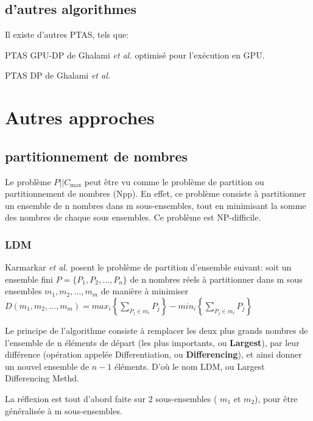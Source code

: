 \documentclass[a4paper,12pt]{report}
\theoremstyle{plain}				%
\theoremstyle{definition}				%
\newcommand\problemGrahamP{$P||C_{\max}$\xspace}
\begin{document}
\subsection{d'autres algorithmes}
Il existe d'autres PTAS, tels que:

PTAS GPU-DP de Ghalami \emph{et al.}
\cite{li2018gpu} optimisé pour l'exécution en GPU.

PTAS DP de Ghalami \emph{et al.} \cite{ghalami2019scheduling}


\section{Autres approches}

\subsection{partitionnement de nombres}

Le problème \problemGrahamP peut être vu comme le problème de
partition ou partitionnement de nombres (Npp).
En effet, ce problème consiste à partitionner un ensemble de n nombres
dans m sous-ensembles, tout en minimisant la somme des nombres de
chaque sous ensembles.
Ce problème est NP-difficile.

\subsubsection{LDM}


Karmarkar \emph{et al.}
\cite{karmarkar1982differencing} posent le problème de partition
d'ensemble suivant: soit un ensemble fini
$P=\{P_1, P_2, \ldots, P_n\}$ de n nombres réels à partitionner dans m
sous ensembles $m_1, m_2, \ldots, m_m$ de manière à minimiser
$D(m_1, m_2, \ldots, m_m) = max_i \left\{ \sum_{P_j \in m_i}P_j
\right\} - min_i \left\{ \sum_{P_j \in m_i}P_j \right\}$

Le principe de l'algorithme consiste à remplacer les deux plus grands
nombres de l'ensemble de n éléments de départ (les plus importants, ou
\textbf{Largest}), par leur différence (opération appelée
Differentiation, ou \textbf{Differencing}), et ainsi donner un nouvel
ensemble de $n-1$ éléments.
D'où le nom LDM, ou Largest Differencing Methd.


La réflexion est tout d'abord faite sur 2 sous-ensembles ( $m_1$ et
$m_2$), pour être généralisée à m sous-ensembles.
\end{document}
